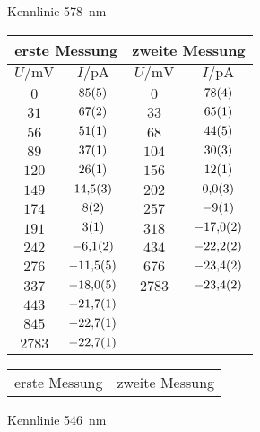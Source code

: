 \begin{figure}[htbp]
   \centering
\parbox{0.475\linewidth}{\centering
\caption{Kennlinie \SI{578}{nm}}
\begin{tabular}{cc||cc}
\hline\multicolumn{2}{c||}{erste Messung} & \multicolumn{2}{c}{zweite Messung}\\

\hline
$U / \unit{\milli\volt}$ & $I / \unit{\pico\ampere}$ & $U / \unit{\milli\volt}$ & $I / \unit{\pico\ampere}$ \\ 
\hline
$\num{0}$ & $\num{85\pm 5}$ & $\num{0}$ & $\num{78\pm 4}$ \\
$\num{31}$ & $\num{67\pm 2}$ & $\num{33}$ & $\num{65\pm 1}$ \\
$\num{56}$ & $\num{51\pm 1}$ & $\num{68}$ & $\num{44\pm 5}$ \\
$\num{89}$ & $\num{37\pm 1}$ & $\num{104}$ & $\num{30\pm 3}$ \\
$\num{120}$ & $\num{26\pm 1}$ & $\num{156}$ & $\num{12\pm 1}$ \\
$\num{149}$ & $\num{14.5\pm 0.3}$ & $\num{202}$ & $\num{0.0\pm 0.3}$ \\
$\num{174}$ & $\num{8\pm 2}$ & $\num{257}$ & $\num{-9\pm 1}$ \\
$\num{191}$ & $\num{3\pm 1}$ & $\num{318}$ & $\num{-17.0\pm 0.2}$ \\
$\num{242}$ & $\num{-6.1\pm 0.2}$ & $\num{434}$ & $\num{-22.2\pm 0.2}$ \\
$\num{276}$ & $\num{-11.5\pm 0.5}$ & $\num{676}$ & $\num{-23.4\pm 0.2}$ \\
$\num{337}$ & $\num{-18.0\pm 0.5}$ & $\num{2783}$ & $\num{-23.4\pm 0.2}$ \\
$\num{443}$ & $\num{-21.7\pm 0.1}$ &    &    \\
$\num{845}$ & $\num{-22.7\pm 0.1}$ &    &    \\
$\num{2783}$ & $\num{-22.7\pm 0.1}$ &    &    \\
\hline\end{tabular}
\label{kennlinie_578nm}
}\quad\parbox{0.475\linewidth}{\centering
\caption{Kennlinie \SI{546}{nm}}
\begin{tabular}{cc||cc}
\hline\multicolumn{2}{c||}{erste Messung} & \multicolumn{2}{c}{zweite Messung}\\


\end{tabular}}
\end{figure}
